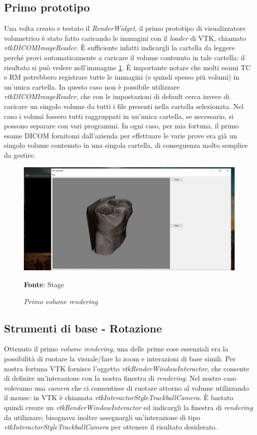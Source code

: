 \subsection{Primo prototipo}
Una volta creato e testato il \emph{RenderWidget}, il primo prototipo di visualizzatore volumetrico è stato fatto caricando le immagini con il \emph{loader} di VTK, chiamato \emph{vtkDICOMImageReader}. \`E sufficiente infatti indicargli la cartella da leggere perché provi automaticamente a caricare il volume contenuto in tale cartella: il risultato si può vedere nell'immagine \ref{fig: firstvolume}. \`E importante notare che molti esami TC e RM potrebbero registrare tutte le immagini (e quindi spesso più volumi) in un'unica cartella. In questo caso non è possibile utilizzare \emph{vtkDICOMImageReader}, che con le impostazioni di default cerca invece di caricare un singolo volume da tutti i file presenti nella cartella selezionata. Nel caso i volumi fossero tutti raggruppati in un'unica cartella, se necessario, si possono separare con vari programmi. In ogni caso, per mia fortuna, il primo esame DICOM fornitomi dall'azienda per effettuare le varie prove era già un singolo volume contenuto in una singola cartella, di conseguenza molto semplice da gestire.

\begin{figure}[h]
    \centering
    \includegraphics[width=1\textwidth]{immagini/svolgimento/firstvolume.jpg}
    \caption{\textit{Primo volume rendering}}
    \textbf{Fonte}: Stage
    \label{fig: firstvolume}
\end{figure}

\subsection{Strumenti di base - Rotazione}
Ottenuto il primo \emph{volume rendering}, una delle prime cose essenziali era la possibilità di ruotare la visuale/fare lo zoom e interazioni di base simili. Per nostra fortuna VTK fornisce l'oggetto \emph{vtkRenderWindowInteractor}, che consente di definire un'interazione con la nostra finestra di \emph{rendering}. Nel nostro caso volevamo una \emph{camera} che ci consentisse di ruotare attorno al volume utilizzando il mouse: in VTK è chiamata \emph{vtkInteractorStyleTrackballCamera}. \`E bastato quindi creare un \emph{vtkRenderWindowInteractor} ed indicargli la finestra di \emph{rendering} da utilizzare; bisognava inoltre assegnargli un'interazione di tipo \emph{vtkInteractorStyleTrackballCamera} per ottenere il risultato desiderato.

